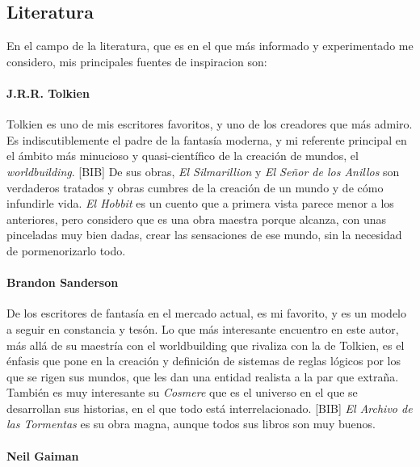 \hypertarget{literatura}{%
\subsection{Literatura}\label{literatura}}

En el campo de la literatura, que es en el que más informado y
experimentado me considero, mis principales fuentes de inspiracion son:

\hypertarget{j.r.r.-tolkien}{%
\paragraph{J.R.R. Tolkien}\label{j.r.r.-tolkien}}

Tolkien es uno de mis escritores favoritos, y uno de los creadores que
más admiro. Es indiscutiblemente el padre de la fantasía moderna, y mi
referente principal en el ámbito más minucioso y quasi-científico de la
creación de mundos, el \emph{worldbuilding}. {[}BIB{]} De sus obras,
\emph{El Silmarillion} y \emph{El Señor de los Anillos} son verdaderos
tratados y obras cumbres de la creación de un mundo y de cómo infundirle
vida. \emph{El Hobbit} es un cuento que a primera vista parece menor a
los anteriores, pero considero que es una obra maestra porque alcanza,
con unas pinceladas muy bien dadas, crear las sensaciones de ese mundo,
sin la necesidad de pormenorizarlo todo.

\hypertarget{brandon-sanderson}{%
\paragraph{Brandon Sanderson}\label{brandon-sanderson}}

De los escritores de fantasía en el mercado actual, es mi favorito, y es
un modelo a seguir en constancia y tesón. Lo que más interesante
encuentro en este autor, más allá de su maestría con el worldbuilding
que rivaliza con la de Tolkien, es el énfasis que pone en la creación y
definición de sistemas de reglas lógicos por los que se rigen sus
mundos, que les dan una entidad realista a la par que extraña. También
es muy interesante su \emph{Cosmere} que es el universo en el que se
desarrollan sus historias, en el que todo está interrelacionado.
{[}BIB{]} \emph{El Archivo de las Tormentas} es su obra magna, aunque
todos sus libros son muy buenos.

\hypertarget{neil-gaiman}{%
\paragraph{Neil Gaiman}\label{neil-gaiman}}


